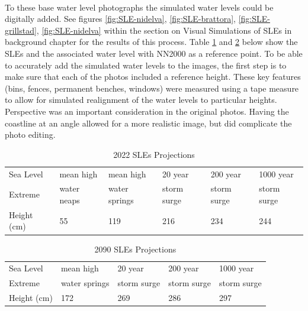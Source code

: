\paragraph{}

To these base water level photographs the simulated water levels could be digitally added. See figures \ref{fig:SLE-nidelva}, \ref{fig:SLE-brattora}, \ref{fig:SLE-grillstad}, \ref{fig:SLE-nidelva} within the section on Visual Simulations of SLEs in background chapter for the results of this process. Table \ref{tab:2022_sle_projections} and \ref{tab:2090_sle_projections} below show the SLEs and the associated water level with NN2000 as a reference point.  To be able to accurately add the simulated water levels to the images, the first step is to make sure that each of the photos included a reference height. These key features (bins, fences, permanent benches, windows) were measured using a tape measure to allow for simulated realignment of the water levels to particular heights. Perspective was an important consideration in the original photos. Having the coastline at an angle allowed for a more realistic image, but did complicate the photo editing. 

\begin{table}[h!]
    \centering
    \begin{tabular}{|l|l|l|l|l|l|}
    \hline
     Sea Level &   mean high  & mean high  & 20 year  & 200 year   & 1000 year  \\ \newline
     Extreme &  water neaps & water springs &  storm surge  & storm surge  &  storm surge  \\ \hline
       Height (cm) &  55 & 119 & 216 & 234 & 244 \\ \hline
    \end{tabular}
    \caption{2022 SLEs Projections \cite{kartverket_se_2020}}
    \label{tab:2022_sle_projections}
\end{table}

\begin{table}[h!]
    \centering
    \begin{tabular}{|l|l|l|l|l|}
    \hline
       Sea Level &  mean high & 20 year   & 200 year &  1000 year   \\ \newline
       Extreme & water springs &  storm surge  &  storm surge  &  storm surge  \\ \hline
       Height (cm) & 172 & 269 & 286 & 297 \\ \hline
    \end{tabular}
    \caption{2090 SLEs Projections \cite{kartverket_se_2020}}
    \label{tab:2090_sle_projections}
\end{table}

